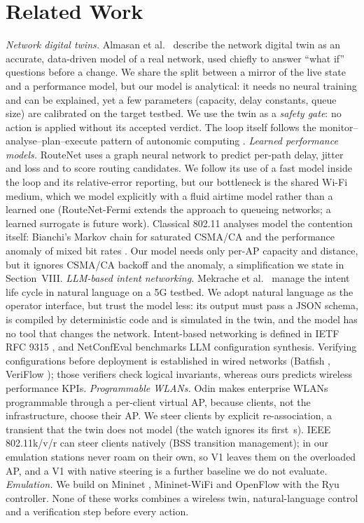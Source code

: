 \documentclass[conference]{IEEEtran}
\begin{document}
\section{Related Work}
\emph{Network digital twins.} Almasan et al.\ \cite{almasan2022} describe the network digital twin as an accurate, data-driven model of a real network, used chiefly to answer ``what if'' questions before a change. We share the split between a mirror of the live state and a performance model, but our model is analytical: it needs no neural training and can be explained, yet a few parameters (capacity, delay constants, queue size) are calibrated on the target testbed. We use the twin as a \emph{safety gate}: no action is applied without its accepted verdict. The loop itself follows the monitor--analyse--plan--execute pattern of autonomic computing \cite{kephart2003}.
\emph{Learned performance models.} RouteNet \cite{rusek2020} uses a graph neural network to predict per-path delay, jitter and loss and to score routing candidates. We follow its use of a fast model inside the loop and its relative-error reporting, but our bottleneck is the shared Wi-Fi medium, which we model explicitly with a fluid airtime model rather than a learned one (RouteNet-Fermi \cite{ferriol2023} extends the approach to queueing networks; a learned surrogate is future work). Classical 802.11 analyses model the contention itself: Bianchi's Markov chain \cite{bianchi2000} for saturated CSMA/CA and the performance anomaly of mixed bit rates \cite{heusse2003}. Our model needs only per-AP capacity and distance, but it ignores CSMA/CA backoff and the anomaly, a simplification we state in Section~VIII.
\emph{LLM-based intent networking.} Mekrache et al.\ \cite{mekrache2024} manage the intent life cycle in natural language on a 5G testbed. We adopt natural language as the operator interface, but trust the model less: its output must pass a JSON schema, is compiled by deterministic code and is simulated in the twin, and the model has no tool that changes the network. Intent-based networking is defined in IETF RFC 9315 \cite{clemm2022}, and NetConfEval \cite{wang2024} benchmarks LLM configuration synthesis. Verifying configurations before deployment is established in wired networks (Batfish \cite{fogel2015}, VeriFlow \cite{khurshid2013}); those verifiers check logical invariants, whereas ours predicts wireless performance KPIs.
\emph{Programmable WLANs.} Odin \cite{suresh2012} makes enterprise WLANs programmable through a per-client virtual AP, because clients, not the infrastructure, choose their AP. We steer clients by explicit re-association, a transient that the twin does not model (the watch ignores its first \CfgSettle\,s). IEEE 802.11k/v/r \cite{ieee80211} can steer clients natively (BSS transition management); in our emulation stations never roam on their own, so V1 leaves them on the overloaded AP, and a V1 with native steering is a further baseline we do not evaluate.
\emph{Emulation.} We build on Mininet \cite{lantz2010}, Mininet-WiFi \cite{fontes2015} and OpenFlow \cite{mckeown2008} with the Ryu controller.
None of these works combines a wireless twin, natural-language control and a verification step before every action.
\end{document}
